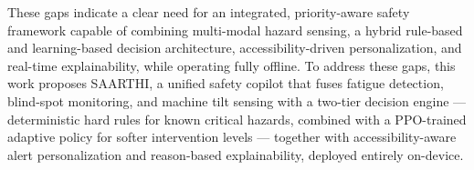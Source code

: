 These gaps indicate a clear need for an integrated, priority-aware safety framework capable of combining multi-modal hazard sensing, a hybrid rule-based and learning-based decision architecture, accessibility-driven personalization, and real-time explainability, while operating fully offline. To address these gaps, this work proposes SAARTHI, a unified safety copilot that fuses fatigue detection, blind-spot monitoring, and machine tilt sensing with a two-tier decision engine --- deterministic hard rules for known critical hazards, combined with a PPO-trained adaptive policy for softer intervention levels --- together with accessibility-aware alert personalization and reason-based explainability, deployed entirely on-device.
